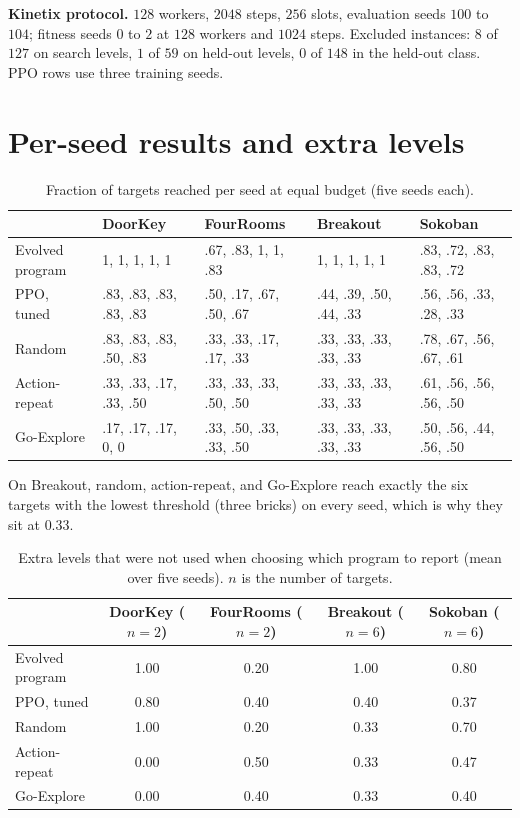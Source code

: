 \documentclass{article}
\begin{document}
\textbf{Kinetix protocol.} $128$ workers, $2048$ steps, $256$ slots, evaluation seeds $100$ to $104$; fitness seeds $0$
to $2$ at $128$ workers and $1024$ steps. Excluded instances: $8$ of $127$ on search levels, $1$ of $59$ on held-out
levels, $0$ of $148$ in the held-out class. PPO rows use three training seeds.

\section{Per-seed results and extra levels}
\label{app:perseed}
\begin{table}[h]\centering\small
\caption{Fraction of targets reached per seed at equal budget (five seeds each).}
\label{tab:perseed}
\setlength{\tabcolsep}{4pt}
\begin{tabular}{@{}lllll@{}}\toprule
 & DoorKey & FourRooms & Breakout & Sokoban \\ \midrule
Evolved program & 1, 1, 1, 1, 1 & .67, .83, 1, 1, .83 & 1, 1, 1, 1, 1 & .83, .72, .83, .83, .72 \\
PPO, tuned & .83, .83, .83, .83, .83 & .50, .17, .67, .50, .67 & .44, .39, .50, .44, .33 & .56, .56, .33, .28, .33 \\
Random & .83, .83, .83, .50, .83 & .33, .33, .17, .17, .33 & .33, .33, .33, .33, .33 & .78, .67, .56, .67, .61 \\
Action-repeat & .33, .33, .17, .33, .50 & .33, .33, .33, .50, .50 & .33, .33, .33, .33, .33 & .61, .56, .56, .56, .50 \\
Go-Explore & .17, .17, .17, 0, 0 & .33, .50, .33, .33, .50 & .33, .33, .33, .33, .33 & .50, .56, .44, .56, .50 \\ \bottomrule
\end{tabular}
\end{table}
On Breakout, random, action-repeat, and Go-Explore reach exactly the six targets with the lowest threshold (three bricks)
on every seed, which is why they sit at $0.33$.

\begin{table}[h]\centering\small
\caption{Extra levels that were not used when choosing which program to report (mean over five seeds). $n$ is the number
of targets.}
\label{tab:heldout}
\begin{tabular}{@{}lcccc@{}}\toprule
 & DoorKey ($n{=}2$) & FourRooms ($n{=}2$) & Breakout ($n{=}6$) & Sokoban ($n{=}6$) \\ \midrule
Evolved program & 1.00 & 0.20 & 1.00 & 0.80 \\
PPO, tuned & 0.80 & 0.40 & 0.40 & 0.37 \\
Random & 1.00 & 0.20 & 0.33 & 0.70 \\
Action-repeat & 0.00 & 0.50 & 0.33 & 0.47 \\
Go-Explore & 0.00 & 0.40 & 0.33 & 0.40 \\ \bottomrule
\end{tabular}
\end{table}
\end{document}

